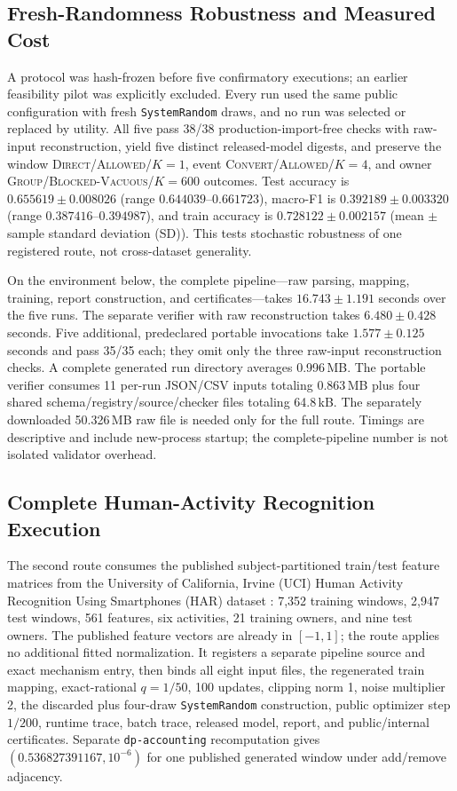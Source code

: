 \documentclass[letterpaper]{article} %
\newcommand{\Direct}{\textsc{Direct}}
\newcommand{\Convert}{\textsc{Convert}}
\newcommand{\Group}{\textsc{Group}}
\newcommand{\Allowed}{\textsc{Allowed}}
\begin{document}
\subsection{Fresh-Randomness Robustness and Measured Cost}

A protocol was hash-frozen before five confirmatory executions; an earlier
feasibility pilot was explicitly excluded.  Every run used the same public
configuration with fresh \texttt{SystemRandom} draws, and no run was selected
or replaced by utility.  All five pass 38/38 production-import-free checks with raw-input
reconstruction, yield five distinct released-model digests, and preserve the
window \Direct{}/\Allowed{}/$K=1$, event
\Convert{}/\Allowed{}/$K=4$, and owner
\Group{}/\textsc{Blocked-Vacuous}/$K=600$ outcomes.  Test accuracy is
$0.655619\pm0.008026$ (range $0.644039$--$0.661723$), macro-F1 is
$0.392189\pm0.003320$ (range $0.387416$--$0.394987$), and train accuracy is
$0.728122\pm0.002157$ (mean $\pm$ sample standard deviation (SD)).  This tests stochastic
robustness of one registered route, not cross-dataset generality.

On the environment below, the complete pipeline---raw parsing, mapping,
training, report construction, and certificates---takes
$16.743\pm1.191$ seconds over the five runs.  The separate verifier with raw
reconstruction takes $6.480\pm0.428$ seconds.  Five additional, predeclared
portable invocations take $1.577\pm0.125$ seconds and pass 35/35 each; they
omit only the three raw-input reconstruction checks.  A complete generated
run directory averages 0.996\,MB.  The portable verifier consumes 11
per-run JSON/CSV inputs totaling 0.863\,MB plus four shared
schema/registry/source/checker files totaling 64.8\,kB.  The separately
downloaded 50.326\,MB raw file is needed only for the full route.  Timings are
descriptive and include new-process startup; the complete-pipeline number is
not isolated validator overhead.

\subsection{Complete Human-Activity Recognition Execution}

The second route consumes the published subject-partitioned train/test feature
matrices from the University of California, Irvine (UCI) Human Activity
Recognition Using Smartphones (HAR) dataset
\citep{anguita2013har,ucihar2013dataset}: 7,352 training windows,
2,947 test windows, 561 features, six activities, 21 training owners, and
nine test owners.  The published feature vectors are already in
$[-1,1]$; the route applies no additional fitted normalization.  It registers
a separate pipeline source and exact mechanism entry, then binds all eight
input files, the regenerated train mapping, exact-rational $q=1/50$, 100
updates, clipping norm 1, noise multiplier 2, the discarded plus four-draw
\texttt{SystemRandom} construction, public optimizer step $1/200$, runtime
trace, batch trace, released model, report, and public/internal certificates.
Separate \texttt{dp-accounting} recomputation \citep{dpaccounting} gives
$(0.536827391167,10^{-6})$ for one published generated window under
add/remove adjacency.
\end{document}
